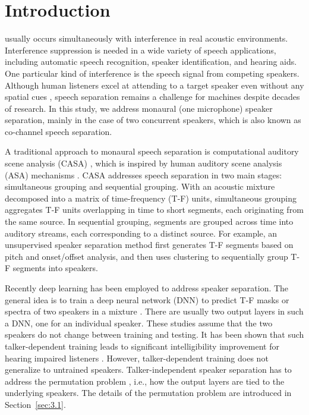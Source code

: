 \documentclass[journal]{IEEEtran}
\begin{document}
\IEEEpeerreviewmaketitle



\section{Introduction}

    


   
       usually occurs simultaneously with interference in real acoustic environments.
   Interference suppression is needed in a wide variety of speech applications, including automatic speech recognition, speaker identification, and hearing aids. 
   One particular kind of interference is the speech signal from competing speakers.
  Although human listeners excel at attending to a target speaker even without any spatial cues \cite{human-ss1}, speech separation remains a challenge for machines despite decades of research. In this study, we address monaural (one microphone) speaker separation, mainly in the case of two concurrent speakers, which is also known as co-channel speech separation.
   
   
A traditional approach to monaural speech separation is computational auditory scene analysis (CASA) \cite{CASA}, which is inspired by human auditory scene analysis (ASA) mechanisms \cite{ASA}. CASA addresses speech separation in two main stages: simultaneous grouping and sequential grouping. 
With an acoustic mixture decomposed into a matrix of time-frequency (T-F) units, simultaneous grouping aggregates T-F units overlapping in time to short segments, each originating from the same source. 
In sequential grouping, segments are grouped across time into auditory streams, each corresponding to a distinct source.
For example, an unsupervised speaker separation method \cite{Ke-unsupervised} first generates T-F segments based on pitch and onset/offset analysis, and then uses clustering to sequentially group T-F segments into speakers.

Recently deep learning has been employed to address speaker separation.
The general idea is to train a deep neural network (DNN) to predict T-F masks or spectra of two speakers in a mixture \cite{Du} \cite{Huang} \cite{Zhang}.
There are usually two output layers in such a DNN, one for an individual speaker. 
These studies assume that the two speakers do not change between training and testing.
It has been shown that such talker-dependent training leads to significant intelligibility improvement for hearing impaired listeners \cite{Masood}.
However, talker-dependent training does not generalize to untrained speakers. Talker-independent speaker separation has to address the permutation problem\cite{DC} \cite{PIT}, i.e., how the output layers are tied to the underlying speakers.
The details of the permutation problem are introduced in Section~\ref{sec:3.1}.
\end{document}
